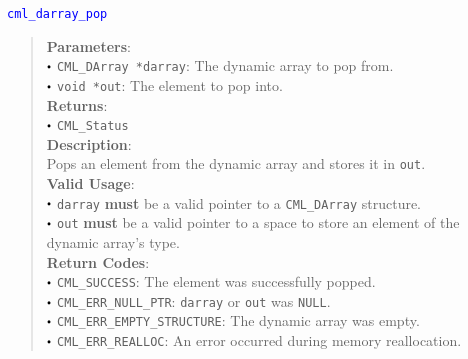 \documentclass[a4paper,oneside,8pt]{extarticle}
\newcommand{\function}[1]{
  \noindent\textcolor{blue}{\texttt{#1}}
  \vspace{-0.3em}
}
\renewcommand{\dot}{\raisebox{0.3ex}{\scalebox{0.6}{$\bullet$}}}
\theoremstyle{definition}
\begin{document}
\function{cml\_darray\_pop}
\begin{quote}
  \textbf{Parameters}: \\
  $\dot$ \texttt{CML\_DArray *darray}: The dynamic array to pop from. \\
  $\dot$ \texttt{void *out}: The element to pop into. \\
  \textbf{Returns}: \\
  $\dot$ \texttt{CML\_Status} \\
  
  \vspace{-0.75em}
  \textbf{Description}: \\
  Pops an element from the dynamic array and stores it in \texttt{out}. \\

  \vspace{-0.75em}
  \textbf{Valid Usage}: \\
  $\dot$ \texttt{darray} \textbf{must} be a valid pointer to a \texttt{CML\_DArray} structure. \\
  $\dot$ \texttt{out} \textbf{must} be a valid pointer to a space to store an element of the dynamic array's type. \\

  \vspace{-0.75em}
  \textbf{Return Codes}: \\
  $\dot$ \texttt{CML\_SUCCESS}: The element was successfully popped. \\
  $\dot$ \texttt{CML\_ERR\_NULL\_PTR}: \texttt{darray} or \texttt{out} was \texttt{NULL}. \\
  $\dot$ \texttt{CML\_ERR\_EMPTY\_STRUCTURE}: The dynamic array was empty. \\
  $\dot$ \texttt{CML\_ERR\_REALLOC}: An error occurred during memory reallocation. \\
\end{quote}
\end{document}
